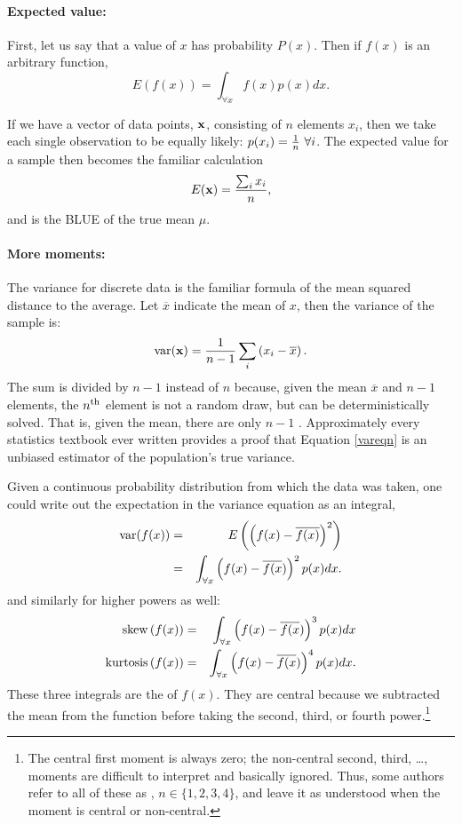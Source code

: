 \paragraph{Expected value:} 
First, let us say that a value of $x$ has probability $P(x)$. Then
if $f(x)$ is an arbitrary function, 
$$E\left(f(x)\right)=\int_{\forall x} f(x)p(x) dx.$$

If we have a vector of data points, ${\bf x}$, consisting of $n$ elements
$x_i$, then we take each single observation to be equally likely:
$p(x_i)={1\over n}\ \forall i$.  The expected value for a sample then
becomes the familiar calculation $$E({\bf x})={\sum_i x_i\over n},$$ and is
the BLUE of the true mean $\mu$. 

\paragraph{More moments:}   
The variance for discrete data is the familiar formula of the mean
squared distance to the average. Let $\overline x$ indicate the mean of
$x$, then the variance of the sample is:
\begin{equation}
\operatorname{var}({\bf x}) = {1\over n-1} \sum_i\left(x_i - \overline x\right).
\label{vareqn}
\end{equation}
The sum is divided by $n-1$ instead of $n$ because, given the mean
$\overline x$ and $n-1$ elements, the $n^{\rm th}$ element is not a
random draw, but can be deterministically solved. That is, given the
mean, there are only $n-1$ . Approximately
every statistics textbook ever written provides a proof that Equation
\ref{vareqn} is an unbiased estimator of the population's true variance.

Given a continuous probability distribution from which the data was
taken, one could write out the
expectation in the variance equation as an integral,
\begin{eqnarray}
\operatorname{var}(f(x))&=&E\left(\left(f(x) - \overline{f(x)}\right)^2\right)\nonumber\\
        &=&\int_{\forall x} \left(f(x) - \overline{f(x})\right)^2 p(x) dx.\nonumber
\end{eqnarray}
and similarly for higher powers as well:
\begin{eqnarray*}
{\rm skew}\left(f(x)\right)&=&\int_{\forall x} \left(f(x) - \overline{f(x})\right)^3 p(x) dx\\
{\rm kurtosis}\left(f(x)\right)&=&\int_{\forall x} \left(f(x) - \overline{f(x})\right)^4 p(x) dx.
\end{eqnarray*} 
These three integrals are the  of $f(x)$. They
are central because we subtracted the mean from the function before
taking the second, third, or fourth power.\footnote{The
central first moment is always zero; the non-central second, third,
\dots, moments are difficult to interpret and basically ignored. Thus,
some authors refer to all of these as , $n \in
\{1, 2, 3, 4\}$, and leave
it as understood when the moment is central or non-central.}

